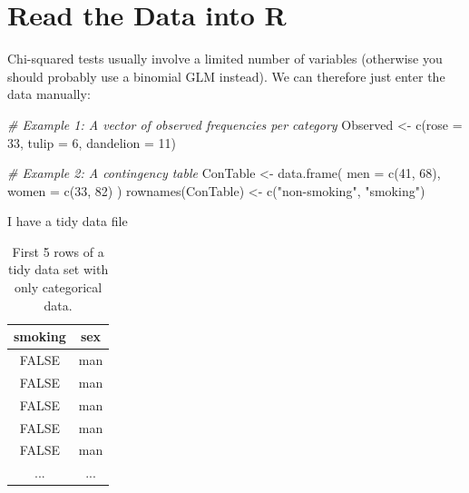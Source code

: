 \documentclass[
]{book}
\newenvironment{Shaded}{\begin{snugshade}}{\end{snugshade}}
\newcommand{\AttributeTok}[1]{\textcolor[rgb]{0.77,0.63,0.00}{#1}}
\newcommand{\CommentTok}[1]{\textcolor[rgb]{0.56,0.35,0.01}{\textit{#1}}}
\newcommand{\DecValTok}[1]{\textcolor[rgb]{0.00,0.00,0.81}{#1}}
\newcommand{\FunctionTok}[1]{\textcolor[rgb]{0.00,0.00,0.00}{#1}}
\newcommand{\NormalTok}[1]{#1}
\newcommand{\OtherTok}[1]{\textcolor[rgb]{0.56,0.35,0.01}{#1}}
\newcommand{\StringTok}[1]{\textcolor[rgb]{0.31,0.60,0.02}{#1}}
\begin{document}
\hypertarget{read-the-data-into-r}{%
\section{Read the Data into R}\label{read-the-data-into-r}}

Chi-squared tests usually involve a limited number of variables (otherwise you should probably use a binomial GLM instead). We can therefore just enter the data manually:

\begin{Shaded}
\begin{Highlighting}[]
\CommentTok{\# Example 1: A vector of observed frequencies per category}
\NormalTok{Observed }\OtherTok{\textless{}{-}} \FunctionTok{c}\NormalTok{(}\AttributeTok{rose =} \DecValTok{33}\NormalTok{, }\AttributeTok{tulip =} \DecValTok{6}\NormalTok{, }\AttributeTok{dandelion =} \DecValTok{11}\NormalTok{)}

\CommentTok{\# Example 2: A contingency table}
\NormalTok{ConTable }\OtherTok{\textless{}{-}} \FunctionTok{data.frame}\NormalTok{(}
  \AttributeTok{men   =} \FunctionTok{c}\NormalTok{(}\DecValTok{41}\NormalTok{, }\DecValTok{68}\NormalTok{),}
  \AttributeTok{women =} \FunctionTok{c}\NormalTok{(}\DecValTok{33}\NormalTok{, }\DecValTok{82}\NormalTok{) }
\NormalTok{)}
\FunctionTok{rownames}\NormalTok{(ConTable) }\OtherTok{\textless{}{-}} \FunctionTok{c}\NormalTok{(}\StringTok{"non{-}smoking"}\NormalTok{, }\StringTok{"smoking"}\NormalTok{)}
\end{Highlighting}
\end{Shaded}

I have a tidy data file

\begin{table}

\caption{\label{tab:unnamed-chunk-23}First 5 rows of a tidy data set with only categorical data.}
\centering
\fontsize{11}{13}\selectfont
\begin{tabular}[t]{c|c}
\hline
smoking & sex\\
\hline
FALSE & man\\
\hline
FALSE & man\\
\hline
FALSE & man\\
\hline
FALSE & man\\
\hline
FALSE & man\\
\hline
... & ...\\
\hline
\end{tabular}
\end{table}
\end{document}
